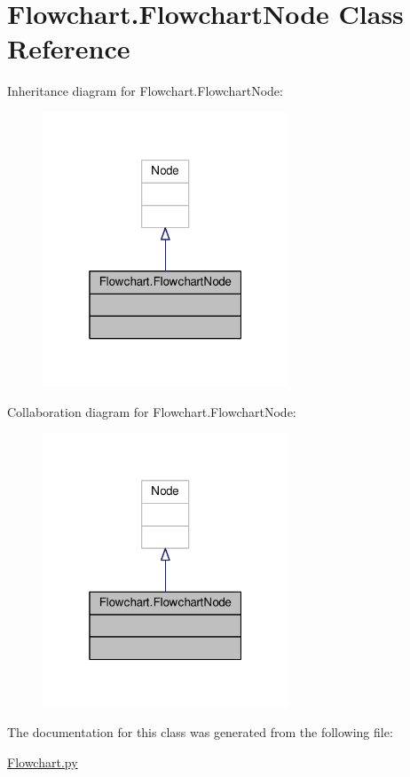 \hypertarget{classFlowchart_1_1FlowchartNode}{}\section{Flowchart.\+Flowchart\+Node Class Reference}
\label{classFlowchart_1_1FlowchartNode}


Inheritance diagram for Flowchart.\+Flowchart\+Node\+:\nopagebreak
\begin{figure}[H]
\begin{center}
\leavevmode
\includegraphics[width=208pt]{d3/dc3/classFlowchart_1_1FlowchartNode__inherit__graph}
\end{center}
\end{figure}


Collaboration diagram for Flowchart.\+Flowchart\+Node\+:\nopagebreak
\begin{figure}[H]
\begin{center}
\leavevmode
\includegraphics[width=208pt]{dd/ded/classFlowchart_1_1FlowchartNode__coll__graph}
\end{center}
\end{figure}


The documentation for this class was generated from the following file\+:\begin{DoxyCompactItemize}
\item 
\hyperlink{Flowchart_8py}{Flowchart.\+py}\end{DoxyCompactItemize}
